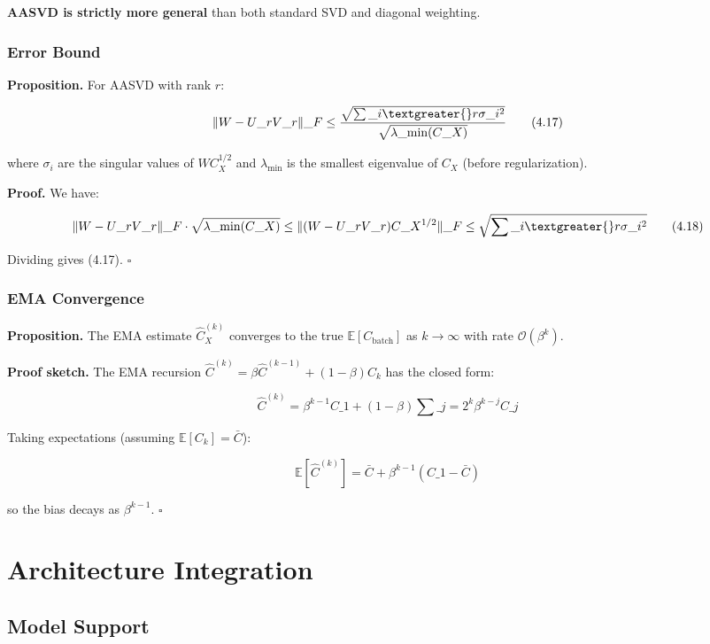 \textbf{AASVD is strictly more general} than both standard SVD and diagonal 
weighting.

\subsubsection{Error Bound}

\textbf{Proposition.} For AASVD with rank $r$:

\[
\|W - U\_r V\_r\|\_F \leq \frac{\sqrt{\sum\_{i \textgreater{} r} \sigma\_i^2}}{\sqrt{\lambda\_\text{min}(C\_X)}}
\tag{4.17}
\]

where $\sigma_i$ are the singular values of $W C_X^{1/2}$ and $\lambda_\text{min}$ 
is the smallest eigenvalue of $C_X$ (before regularization).

\textbf{Proof.} We have:

\[
\|W - U\_r V\_r\|\_F \cdot \sqrt{\lambda\_\text{min}(C\_X)}
\leq \|(W - U\_r V\_r) C\_X^{1/2}\|\_F
\leq \sqrt{\sum\_{i \textgreater{} r} \sigma\_i^2}
\tag{4.18}
\]

Dividing gives (4.17). $\square$

\subsubsection{EMA Convergence}

\textbf{Proposition.} The EMA estimate $\hat{C}_X^{(k)}$ converges to the true 
$\mathbb{E}[C_\text{batch}]$ as $k \to \infty$ with rate $\mathcal{O}(\beta^k)$.

\textbf{Proof sketch.} The EMA recursion $\hat{C}^{(k)} = \beta \hat{C}^{(k-1)} + (1-\beta) C_k$ 
has the closed form:

\[
\hat{C}^{(k)} = \beta^{k-1} C\_1 + (1 - \beta) \sum\_{j=2}^{k} \beta^{k-j} C\_j
\tag{4.19}
\]

Taking expectations (assuming $\mathbb{E}[C_k] = \bar{C}$):

\[
\mathbb{E}[\hat{C}^{(k)}] = \bar{C} + \beta^{k-1} (C\_1 - \bar{C})
\tag{4.20}
\]

so the bias decays as $\beta^{k-1}$. $\square$


\section{Architecture Integration}

\subsection{Model Support}

